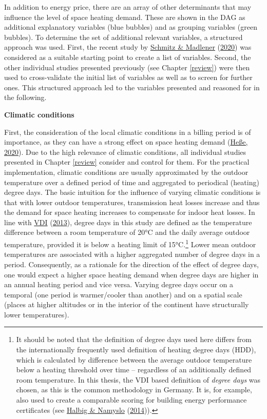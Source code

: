 \documentclass[12pt,twoside]{reedthesis}
\begin{document}
In addition to energy price, there are an array of other determinants that may influence the level of space heating demand. These are shown in the DAG as additional explanatory variables (blue bubbles) and as grouping variables (green bubbles). To determine the set of additional relevant variables, a structured approach was used. First, the recent study by \protect\hyperlink{ref-schmitz_madlener20}{Schmitz \& Madlener} (\protect\hyperlink{ref-schmitz_madlener20}{2020}) was considered as a suitable starting point to create a list of variables. Second, the other individual studies presented previously (see Chapter \ref{review}) were then used to cross-validate the initial list of variables as well as to screen for further ones. This structured approach led to the variables presented and reasoned for in the following.

\textbf{Climatic conditions}

First, the consideration of the local climatic conditions in a billing period is of importance, as they can have a strong effect on space heating demand (\protect\hyperlink{ref-hesse20}{Heße, 2020}). Due to the high relevance of climatic conditions, all individual studies presented in Chapter \ref{review} consider and control for them. For the practical implementation, climatic conditions are usually approximated by the outdoor temperature over a defined period of time and aggregated to periodical (heating) degree days. The basic intuition for the influence of varying climatic conditions is that with lower outdoor temperatures, transmission heat losses increase and thus the demand for space heating increases to compensate for indoor heat losses. In line with \protect\hyperlink{ref-vdi13}{VDI} (\protect\hyperlink{ref-vdi13}{2013}), degree days in this study are defined as the temperature difference between a room temperature of 20°C and the daily average outdoor temperature, provided it is below a heating limit of 15°C.\footnote{It should be noted that the definition of degree days used here differs from the internationally frequently used definition of heating degree days (HDD), which is calculated by difference between the average outdoor temperature below a heating threshold over time -- regardless of an additionally defined room temperature. In this thesis, the VDI based definition of \emph{degree days} was chosen, as this is the common methodology in Germany. It is, for example, also used to create a comparable scoring for building energy performance certificates (see \protect\hyperlink{ref-halbig_namyslo14}{Halbig \& Namyslo} (\protect\hyperlink{ref-halbig_namyslo14}{2014})).} Lower mean outdoor temperatures are associated with a higher aggregated number of degree days in a period. Consequently, as a rationale for the direction of the effect of degree days, one would expect a higher space heating demand when degree days are higher in an annual heating period and vice versa. Varying degree days occur on a temporal (one period is warmer/cooler than another) and on a spatial scale (places at higher altitudes or in the interior of the continent have structurally lower temperatures).
\end{document}
